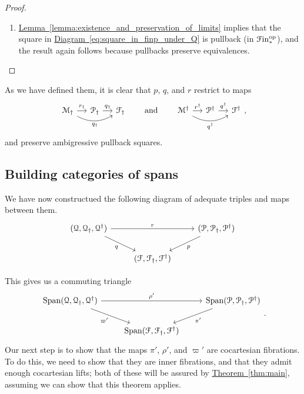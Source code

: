 \documentclass[main.tex]{subfiles}
\begin{document}
\begin{proof}
\begin{enumerate}
\begin{enumerate}
        \item \hyperref[lemma:existence_and_preservation_of_limits]{Lemma~\ref*{lemma:existence_and_preservation_of_limits}} implies that the square in \hyperref[eq:square_in_finp_under_Q]{Diagram~\ref*{eq:square_in_finp_under_Q}} is pullback (in $\mathcal{F}\mathrm{in}_{*}^{\mathrm{op}}$), and the result again follows because pullbacks preserve equivalences.
      \end{enumerate}
  \end{enumerate}
\end{proof}

As we have defined them, it is clear that $p$, $q$, and $r$ restrict to maps
\begin{equation*}
  \begin{tikzcd}[column sep=small]
    \mathcal{M}_{\dagger}
    \arrow[r, "r_{\dagger}"]
    \arrow[rr, swap,  bend right, "q_{\dagger}"]
    & \mathcal{P}_{\dagger}
    \arrow[r, "q_{\dagger}"]
    & \mathcal{F}_{\dagger}
  \end{tikzcd}
  \qquad\text{and}\qquad
  \begin{tikzcd}[column sep=small]
    \mathcal{M}^{\dagger}
    \arrow[r, "r^{\dagger}"]
    \arrow[rr, swap,  bend right, "q^{\dagger}"]
    & \mathcal{P}^{\dagger}
    \arrow[r, "q^{\dagger}"]
    & \mathcal{F}^{\dagger}
  \end{tikzcd},
\end{equation*}
and preserve ambigressive pullback squares.


\subsection{Building categories of spans}
\label{ssc:building_categories_of_spans}

We have now constructued the following diagram of adequate triples and maps between them.
\begin{equation*}
  \begin{tikzcd}
    \triple{Q}
    \arrow[rr, "r"]
    \arrow[dr, swap, "q"]
    && \triple{P}
    \arrow[dl, "p"]
    \\
    & \triple{F}
  \end{tikzcd}
\end{equation*}

This gives us a commuting triangle
\begin{equation}
  \label{eq:commuting_diagram_of_spans}
  \begin{tikzcd}
    \Span\triple{Q}
    \arrow[rr, "\rho'"]
    \arrow[dr, swap, "\varpi'"]
    && \Span\triple{P}
    \arrow[dl, "\pi'"]
    \\
    & \Span\triple{F}
  \end{tikzcd}.
\end{equation}
Our next step is to show that the maps $\pi'$, $\rho'$, and $\varpi'$ are cocartesian fibrations. To do this, we need to show that they are inner fibrations, and that they admit enough cocartesian lifts; both of these will be assured by \hyperref[thm:main]{Theorem~\ref*{thm:main}}, assuming we can show that this theorem applies.
\end{document}
